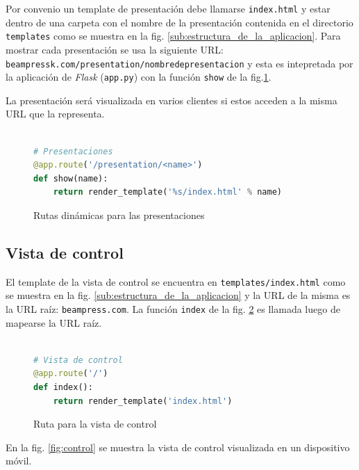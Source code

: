 			Por convenio un template de presentación debe llamarse \texttt{index.html} y estar dentro de una carpeta con el nombre de la presentación contenida en el directorio \texttt{templates} como se muestra en la fig. \ref{sub:estructura_de_la_aplicacion}. Para mostrar cada presentación se usa la siguiente URL: \\
			\texttt{beampressk.com/presentation/nombre\textendash de\textendash presentacion} y esta es intepretada por la aplicación de \textit{Flask} (\texttt{app.py}) con la función \texttt{show} de la fig.\ref{fig:presentation_routes}.

			La presentación será visualizada en varios clientes si estos acceden a la misma URL que la representa. 

			\begin{figure}[htb]%
				\begin{lstlisting}[language=Python]%

# Presentaciones
@app.route('/presentation/<name>')
def show(name):
    return render_template('%s/index.html' % name)
				\end{lstlisting}
			\caption{Rutas dinámicas para las presentaciones}
			\label{fig:presentation_routes}
			\end{figure}


		\subsection{Vista de control} %
		\label{sub:vista_de_control}
			El template de la vista de control se encuentra en \texttt{templates/index.html} como se muestra en la fig. \ref{sub:estructura_de_la_aplicacion} y la URL de la misma es la URL raíz: \texttt{beampress.com}. La función \texttt{index} de la fig. \ref{fig:control_view_code} es llamada luego de mapearse la URL raíz.

			\begin{figure}[htb]%
				\begin{lstlisting}[language=Python]%

# Vista de control
@app.route('/')
def index():
    return render_template('index.html')
				\end{lstlisting}
			\caption{Ruta para la vista de control}
			\label{fig:control_view_code}
			\end{figure}

			En la fig. \ref{fig:control} se muestra la vista de control visualizada en un dispositivo móvil.

